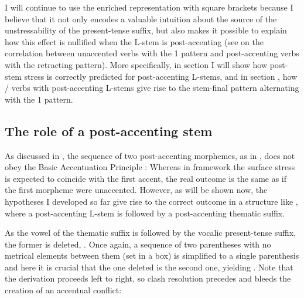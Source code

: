 \documentclass[output=paper,colorlinks,citecolor=black,koreanfont]{langscibook}
\begin{document}
\noindent I will continue to use the enriched representation with square brackets because I believe that it not only encodes a valuable intuition about the source of the unstressability of the present-tense suffix, but also makes it possible to explain how this effect is nullified when the L-stem is post-accenting (see  on the correlation between unaccented  verbs with the {1\SG} pattern and post-accenting  verbs with the retracting pattern). More specifically, in section  I will show how post-stem stress is correctly predicted for post-accenting L-stems, and in section , how / verbs with post-accenting L-stems give rise to the stem-final pattern alternating with the {1\SG} pattern. 

\subsection{The role of a post-accenting stem}\label{mat:subsec:PostAccentingRole}

As discussed in , the sequence of two post-accenting morphemes, as in , does not obey the Basic Accentuation Principle : Whereas in  framework the surface stress is expected to coincide with the first accent, the real outcome is the same as if the first morpheme were unaccented. However, as will be shown now, the hypotheses I developed so far give rise to the correct outcome in a structure like , where a post-accenting L-stem is followed by a post-accenting thematic suffix. 

As the vowel of the thematic suffix is followed by the vocalic present-tense suffix, the former is deleted, . Once again, a sequence of two parentheses with no metrical elements between them (set in a box) is simplified to a single parenthesis and here it is crucial that the one deleted is the second one, yielding . Note that the derivation proceeds left to right, so clash resolution precedes and bleeds the creation of an accentual conflict:\bigskip\bigskip\bigskip
\end{document}
